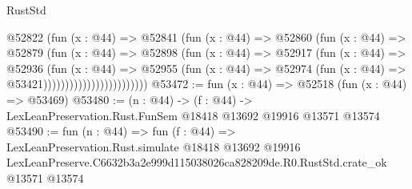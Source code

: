 \begin{lexlean}{RustStd}
\begin{coremodule}
                                @52822
                                  (fun (x : @44) =>
                                  @52841
                                    (fun (x : @44) =>
                                    @52860
                                      (fun (x : @44) =>
                                      @52879
                                        (fun (x : @44) =>
                                        @52898
                                          (fun (x : @44) =>
                                          @52917
                                            (fun (x : @44) =>
                                            @52936
                                              (fun (x : @44) =>
                                              @52955
                                                (fun (x : @44) =>
                                                @52974
                                                  (fun (x : @44) => @53421))))))))))))))))))))))))
@53472 := fun (x : @44) => @52518 (fun (x : @44) => @53469)
@53480 := (n : @44) ->
  (f : @44) -> LexLeanPreservation.Rust.FunSem @18418 @13692 @19916 @13571 @13574
@53490 := fun (n : @44) =>
  fun (f : @44) =>
  LexLeanPreservation.Rust.simulate
    @18418
    @13692
    @19916
    LexLeanPreserve.C6632b3a2e999d115038026ca828209de.R0.RustStd.crate_ok
    @13571
    @13574
\end{coremodule}
\end{lexlean}
